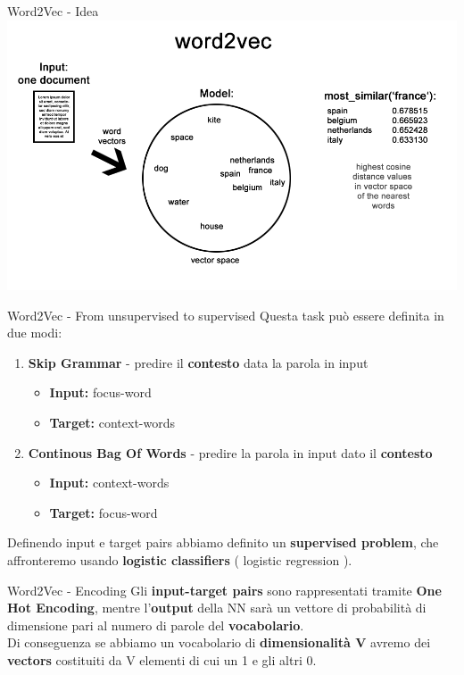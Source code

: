 \documentclass[british]{beamer}
\begin{document}
\begin{frame}{Word2Vec - Idea}
	\includegraphics[width=0.8\linewidth]{./Imgs/word2vec-working.png}
\end{frame}

\begin{frame}{Word2Vec - From unsupervised to supervised}
	Questa task pu\`{o} essere definita in due modi:
	\begin{enumerate}
		\item \textbf{Skip Grammar} - predire il \textbf{contesto} data la parola in input
		\begin{itemize}
			\item \textbf{Input: }focus-word
			\item \textbf{Target: }context-words
		\end{itemize}
		\item \textbf{Continous Bag Of Words} - predire la parola in input dato il \textbf{contesto}
		\begin{itemize}
			\item \textbf{Input: }context-words
			\item \textbf{Target: }focus-word
		\end{itemize}
	\end{enumerate}
	Definendo input e target pairs abbiamo definito un \textbf{supervised problem}, che affronteremo usando \textbf{logistic classifiers} ( logistic regression ).
\end{frame}

\begin{frame}{Word2Vec - Encoding}
	Gli \textbf{input-target pairs} sono rappresentati tramite \textbf{One Hot Encoding}, mentre l'\textbf{output} della NN sar\`{a} un vettore di probabilit\`{a} di dimensione pari al numero di parole del \textbf{vocabolario}.\\
	Di conseguenza se abbiamo un vocabolario di \textbf{dimensionalit\`{a} V} avremo dei \textbf{vectors} costituiti da V elementi di cui un 1 e gli altri 0.
\end{frame}
\end{document}
